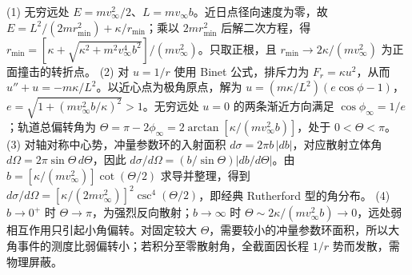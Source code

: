 (1) 无穷远处 \(E=mv_\infty^2/2\)、\(L=mv_\infty b\)。近日点径向速度为零，故 \(E=L^2/(2mr_{\min}^2)+\kappa/r_{\min}\)；乘以 \(2mr_{\min}^2\) 后解二次方程，得 \(r_{\min}=[\kappa+\sqrt{\kappa^2+m^2v_\infty^4b^2}]/(mv_\infty^2)\)。只取正根，且 \(r_{\min}\to2\kappa/(mv_\infty^2)\) 为正面撞击的转折点。
(2) 对 \(u=1/r\) 使用 Binet 公式，排斥力为 \(F_r=\kappa u^2\)，从而 \(u''+u=-m\kappa/L^2\)。以近心点为极角原点，解为 \(u=(m\kappa/L^2)(e\cos\phi-1)\)，\(e=\sqrt{1+(mv_\infty^2 b/\kappa)^2}>1\)。无穷远处 \(u=0\) 的两条渐近方向满足 \(\cos\phi_\infty=1/e\)；轨道总偏转角为 \(\Theta=\pi-2\phi_\infty=2\arctan[\kappa/(mv_\infty^2b)]\)，处于 \(0<\Theta<\pi\)。
(3) 对轴对称中心势，冲量参数环的入射面积 \(d\sigma=2\pi b\,|db|\)，对应散射立体角 \(d\Omega=2\pi\sin\Theta\,d\Theta\)，因此 \(d\sigma/d\Omega=(b/\sin\Theta)|db/d\Theta|\)。由 \(b=[\kappa/(mv_\infty^2)]\cot(\Theta/2)\) 求导并整理，得到 \(d\sigma/d\Omega=[\kappa/(2mv_\infty^2)]^2\csc^4(\Theta/2)\)，即经典 Rutherford 型的角分布。
(4) \(b\to0^+\) 时 \(\Theta\to\pi\)，为强烈反向散射；\(b\to\infty\) 时 \(\Theta\sim2\kappa/(mv_\infty^2b)\to0\)，远处弱相互作用只引起小角偏转。对固定较大 \(\Theta\)，需要较小的冲量参数环面积，所以大角事件的测度比弱偏转小；若积分至零散射角，全截面因长程 \(1/r\) 势而发散，需物理屏蔽。
